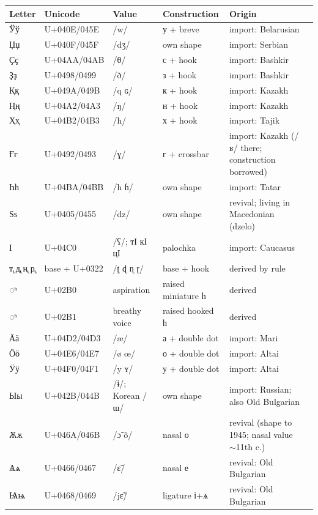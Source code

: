 \documentclass[11pt]{article}
\newcommand{\cz}[1]{{\chu #1}}
\newcommand{\ph}[1]{{\ipafont/#1/}}
\begin{document}
\begin{table}[ht]\centering\footnotesize\setlength{\tabcolsep}{3.5pt}
\begin{tabular}{llllll}
\toprule
Letter & Unicode & Value & Construction & Origin \\
\midrule
\cz{Ўў} & U+040E/045E & \ph{w} & у + breve & import: Belarusian \\
\cz{Џџ} & U+040F/045F & \ph{dʒ} & own shape & import: Serbian \\
\cz{Ҫҫ} & U+04AA/04AB & \ph{θ} & с + hook & import: Bashkir \\
\cz{Ҙҙ} & U+0498/0499 & \ph{ð} & з + hook & import: Bashkir \\
\cz{Ққ} & U+049A/049B & \ph{q ɢ} & к + hook & import: Kazakh \\
\cz{Ңң} & U+04A2/04A3 & \ph{ŋ} & н + hook & import: Kazakh \\
\cz{Ҳҳ} & U+04B2/04B3 & \ph{ħ} & х + hook & import: Tajik \\
\cz{Ғғ} & U+0492/0493 & \ph{ɣ} & г + crossbar & import: Kazakh (\ph{ʁ} there; construction borrowed) \\
\cz{Һһ} & U+04BA/04BB & \ph{h ɦ} & own shape & import: Tatar \\
\cz{Ѕѕ} & U+0405/0455 & \ph{dz} & own shape & revival; living in Macedonian (dzelo) \\
\cz{Ӏ} & U+04C0 & \ph{ʕ}; \cz{тӀ кӀ цӀ} & palochka & import: Caucasus \\
\cz{т̢ д̢ н̢ р̢} & base + U+0322 & \ph{ʈ ɖ ɳ ɽ} & base + hook & derived by rule \\
\cz{◌ʰ} & U+02B0 & aspiration & raised miniature \cz{һ} & derived \\
\cz{◌ʱ} & U+02B1 & breathy voice & raised hooked \cz{һ} & derived \\
\cz{Ӓӓ} & U+04D2/04D3 & \ph{æ} & а + double dot & import: Mari \\
\cz{Ӧӧ} & U+04E6/04E7 & \ph{ø œ} & о + double dot & import: Altai \\
\cz{Ӱӱ} & U+04F0/04F1 & \ph{y ʏ} & у + double dot & import: Altai \\
\cz{Ыы} & U+042B/044B & \ph{ɨ}; Korean \ph{ɯ} & own shape & import: Russian; also Old Bulgarian \\
\cz{Ѫѫ} & U+046A/046B & \ph{ɔ̃ õ} & nasal о & revival (shape to 1945; nasal value $\sim$11th c.) \\
\cz{Ѧѧ} & U+0466/0467 & \ph{ɛ̃} & nasal е & revival: Old Bulgarian \\
\cz{Ѩѩ} & U+0468/0469 & \ph{jɛ̃} & ligature і+ѧ & revival: Old Bulgarian \\

\end{tabular}
\end{table}
\end{document}
